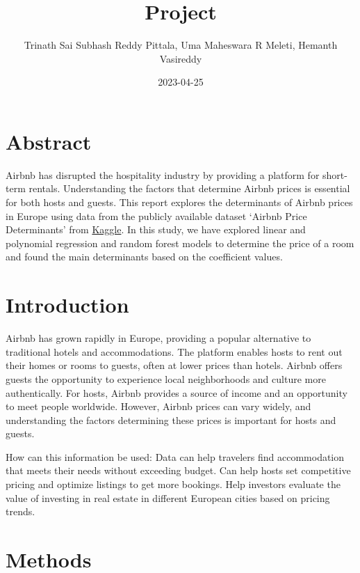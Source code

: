 \documentclass[
]{article}
\title{Project}
\author{Trinath Sai Subhash Reddy Pittala, Uma Maheswara R Meleti,
Hemanth Vasireddy}
\date{2023-04-25}
\begin{document}
\maketitle

\hypertarget{abstract}{%
\section{Abstract}\label{abstract}}

Airbnb has disrupted the hospitality industry by providing a platform
for short-term rentals. Understanding the factors that determine Airbnb
prices is essential for both hosts and guests. This report explores the
determinants of Airbnb prices in Europe using data from the publicly
available dataset `Airbnb Price Determinants' from
\href{https://www.kaggle.com/datasets/thedevastator/airbnb-price-determinants-in-europe}{Kaggle}.
In this study, we have explored linear and polynomial regression and
random forest models to determine the price of a room and found the main
determinants based on the coefficient values.

\hypertarget{introduction}{%
\section{Introduction}\label{introduction}}

Airbnb has grown rapidly in Europe, providing a popular alternative to
traditional hotels and accommodations. The platform enables hosts to
rent out their homes or rooms to guests, often at lower prices than
hotels. Airbnb offers guests the opportunity to experience local
neighborhoods and culture more authentically. For hosts, Airbnb provides
a source of income and an opportunity to meet people worldwide. However,
Airbnb prices can vary widely, and understanding the factors determining
these prices is important for hosts and guests.

How can this information be used: Data can help travelers find
accommodation that meets their needs without exceeding budget. Can help
hosts set competitive pricing and optimize listings to get more
bookings. Help investors evaluate the value of investing in real estate
in different European cities based on pricing trends.

\hypertarget{methods}{%
\section{Methods}\label{methods}}
\end{document}
